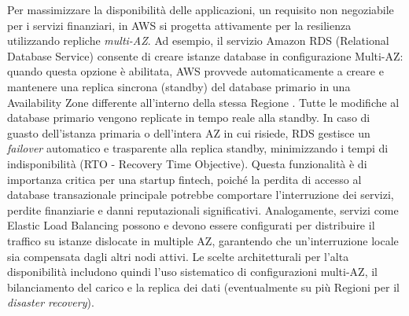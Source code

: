 Per massimizzare la disponibilità delle applicazioni, un requisito non negoziabile per i servizi finanziari, in AWS si progetta attivamente per la resilienza utilizzando repliche \textit{multi-AZ}. Ad esempio, il servizio Amazon RDS (Relational Database Service) consente di creare istanze database in configurazione Multi-AZ: quando questa opzione è abilitata, AWS provvede automaticamente a creare e mantenere una replica sincrona (standby) del database primario in una Availability Zone differente all'interno della stessa Regione \cite{aws-rds-multiaz}. Tutte le modifiche al database primario vengono replicate in tempo reale alla standby. In caso di guasto dell'istanza primaria o dell'intera AZ in cui risiede, RDS gestisce un \textit{failover} automatico e trasparente alla replica standby, minimizzando i tempi di indisponibilità (RTO - Recovery Time Objective). Questa funzionalità è di importanza critica per una startup fintech, poiché la perdita di accesso al database transazionale principale potrebbe comportare l'interruzione dei servizi, perdite finanziarie e danni reputazionali significativi. Analogamente, servizi come Elastic Load Balancing possono e devono essere configurati per distribuire il traffico su istanze dislocate in multiple AZ, garantendo che un'interruzione locale sia compensata dagli altri nodi attivi. Le scelte architetturali per l'alta disponibilità includono quindi l'uso sistematico di configurazioni multi-AZ, il bilanciamento del carico e la replica dei dati (eventualmente su più Regioni per il \textit{disaster recovery}).

